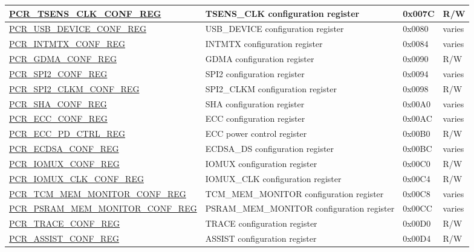 \begin{longtable}{ | p{7cm} | p{6.2cm} | p{1.3cm} | p{1cm} | }
\hyperref[regdesc:PCRTSENSCLKCONFREG]{PCR\_TSENS\_CLK\_CONF\_REG} & TSENS\_CLK configuration register & 0x007C & R/W \\ \hline
\hyperref[regdesc:PCRUSBDEVICECONFREG]{PCR\_USB\_DEVICE\_CONF\_REG} & USB\_DEVICE configuration register & 0x0080 & varies \\ \hline
\hyperref[regdesc:PCRINTMTXCONFREG]{PCR\_INTMTX\_CONF\_REG} & INTMTX configuration register & 0x0084 & varies \\ \hline
\hyperref[regdesc:PCRGDMACONFREG]{PCR\_GDMA\_CONF\_REG} & GDMA configuration register & 0x0090 & R/W \\ \hline
\hyperref[regdesc:PCRSPI2CONFREG]{PCR\_SPI2\_CONF\_REG} & SPI2 configuration register & 0x0094 & varies \\ \hline
\hyperref[regdesc:PCRSPI2CLKMCONFREG]{PCR\_SPI2\_CLKM\_CONF\_REG} & SPI2\_CLKM configuration register & 0x0098 & R/W \\ \hline
\hyperref[regdesc:PCRSHACONFREG]{PCR\_SHA\_CONF\_REG} & SHA configuration register & 0x00A0 & varies \\ \hline
\hyperref[regdesc:PCRECCCONFREG]{PCR\_ECC\_CONF\_REG} & ECC configuration register & 0x00AC & varies \\ \hline
\hyperref[regdesc:PCRECCPDCTRLREG]{PCR\_ECC\_PD\_CTRL\_REG} & ECC power control register & 0x00B0 & R/W \\ \hline
\hyperref[regdesc:PCRECDSACONFREG]{PCR\_ECDSA\_CONF\_REG} & ECDSA\_DS configuration register & 0x00BC & varies \\ \hline
\hyperref[regdesc:PCRIOMUXCONFREG]{PCR\_IOMUX\_CONF\_REG} & IOMUX configuration register & 0x00C0 & R/W \\ \hline
\hyperref[regdesc:PCRIOMUXCLKCONFREG]{PCR\_IOMUX\_CLK\_CONF\_REG} & IOMUX\_CLK configuration register & 0x00C4 & R/W \\ \hline
\hyperref[regdesc:PCRTCMMEMMONITORCONFREG]{PCR\_TCM\_MEM\_MONITOR\_CONF\_REG} & TCM\_MEM\_MONITOR configuration register & 0x00C8 & varies \\ \hline
\hyperref[regdesc:PCRPSRAMMEMMONITORCONFREG]{PCR\_PSRAM\_MEM\_MONITOR\_CONF\_REG} & PSRAM\_MEM\_MONITOR configuration register & 0x00CC & varies \\ \hline
\hyperref[regdesc:PCRTRACECONFREG]{PCR\_TRACE\_CONF\_REG} & TRACE configuration register & 0x00D0 & R/W \\ \hline
\hyperref[regdesc:PCRASSISTCONFREG]{PCR\_ASSIST\_CONF\_REG} & ASSIST configuration register & 0x00D4 & R/W \\ \hline

\end{longtable}
